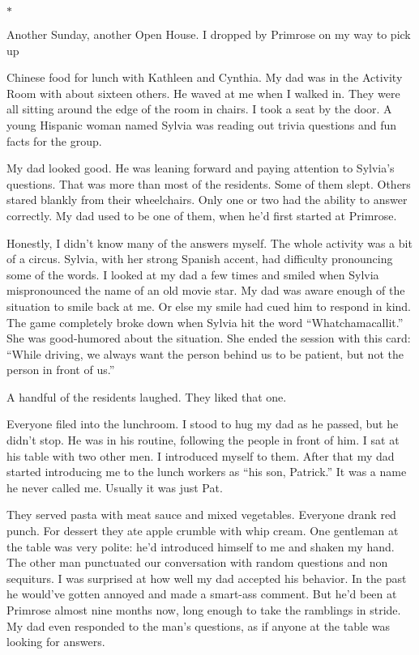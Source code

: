 \documentclass[12pt]{book}
\begin{document}
\begin{center}$*$\end{center}

Another Sunday, another Open House. I dropped by Primrose on my way to pick up

Chinese food for lunch with Kathleen and Cynthia. My dad was in the Activity Room with about sixteen others. He waved at me when I walked in. They were all sitting around the edge of the room in chairs. I took a seat by the door. A young Hispanic woman named Sylvia was reading out trivia questions and fun facts for the group.

My dad looked good. He was leaning forward and paying attention to Sylvia's questions. That was more than most of the residents. Some of them slept. Others stared blankly from their wheelchairs. Only one or two had the ability to answer correctly. My dad used to be one of them, when he'd first started at Primrose.

Honestly, I didn't know many of the answers myself. The whole activity was a bit of a circus. Sylvia, with her strong Spanish accent, had difficulty pronouncing some of the words. I looked at my dad a few times and smiled when Sylvia mispronounced the name of an old movie star. My dad was aware enough of the situation to smile back at me. Or else my smile had cued him to respond in kind. The game completely broke down when Sylvia hit the word ``Whatchamacallit.'' She was good-humored about the situation. She ended the session with this card: ``While driving, we always want the person behind us to be patient, but not the person in front of us.''

A handful of the residents laughed. They liked that one.

Everyone filed into the lunchroom. I stood to hug my dad as he passed, but he didn't stop. He was in his routine, following the people in front of him. I sat at his table with two other men. I introduced myself to them. After that my dad started introducing me to the lunch workers as ``his son, Patrick.'' It was a name he never called me. Usually it was just Pat.

They served pasta with meat sauce and mixed vegetables. Everyone drank red punch. For dessert they ate apple crumble with whip cream. One gentleman at the table was very polite: he'd introduced himself to me and shaken my hand. The other man punctuated our conversation with random questions and non sequiturs. I was surprised at how well my dad accepted his behavior. In the past he would've gotten annoyed and made a smart-ass comment. But he'd been at Primrose almost nine months now, long enough to take the ramblings in stride. My dad even responded to the man's questions, as if anyone at the table was looking for answers.
\end{document}
